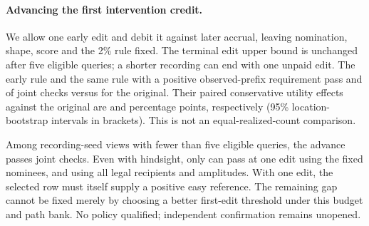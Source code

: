 \paragraph{Advancing the first intervention credit.}
We allow one early edit and debit it against later accrual, leaving
nomination, shape, score and the 2\% rule fixed. The terminal edit
upper bound is unchanged after five eligible queries; a shorter
recording can end with one unpaid edit. The early rule and the same
rule with a positive observed-prefix requirement pass \CreditAdvance{}
and \CreditPrefix{} of \CreditViews{} joint checks versus
\CreditAnchor{} for the original. Their paired conservative utility
effects against the original are \CreditEffect{} and
\CreditPrefixEffect{} percentage points, respectively
(95\% location-bootstrap intervals in brackets). This is not an
equal-realized-count comparison.

Among \CreditShort{} recording-seed views with fewer than five eligible
queries, the advance passes \CreditRescue{} joint checks. Even with
hindsight, only \CreditNominee{} can pass at one edit using the fixed
nominees, and \CreditFull{} using all legal recipients and amplitudes.
With one edit, the selected row must itself supply a positive easy
reference. The remaining gap cannot be fixed merely by choosing a
better first-edit threshold under this budget and path bank.
No policy qualified; independent confirmation remains unopened.
